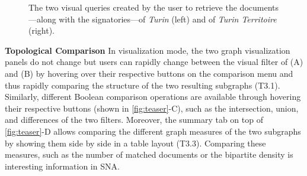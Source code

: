 \begin{figure}
    \caption{The two visual queries created by the user to retrieve the documents---along with the signatories---of \textit{Turin} (left) and of \textit{Turin Territoire} (right).} \label{fig:visualQueriesExamples}
\end{figure}

\noindent\textbf{Topological Comparison}
In visualization mode, the two graph visualization panels do not change but users can rapidly change between the visual filter of (A) and (B) by hovering over their respective buttons on the comparison menu and thus rapidly comparing the structure of the two resulting subgraphs (T3.1). Similarly, different Boolean comparison operations are available through hovering their respective buttons (shown in \autoref{fig:teaser}-C), such as the intersection, union, and differences of the two filters. %
Moreover, the summary tab on top of \autoref{fig:teaser}-D allows comparing the different graph measures of the two subgraphs by showing them side by side in a table layout (T3.3).
Comparing these measures, such as the number of matched documents or the bipartite density is interesting information in SNA.

